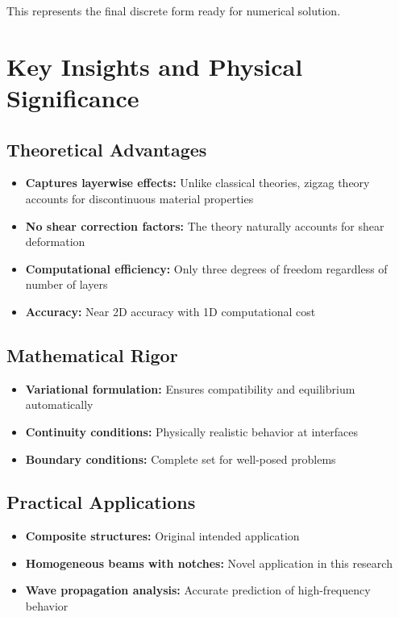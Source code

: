 \documentclass[12pt,a4paper]{article}
\begin{document}
This represents the final discrete form ready for numerical solution.

\section{Key Insights and Physical Significance}

\subsection{Theoretical Advantages}

\begin{itemize}
\item \textbf{Captures layerwise effects:} Unlike classical theories, zigzag theory accounts for discontinuous material properties
\item \textbf{No shear correction factors:} The theory naturally accounts for shear deformation
\item \textbf{Computational efficiency:} Only three degrees of freedom regardless of number of layers
\item \textbf{Accuracy:} Near 2D accuracy with 1D computational cost
\end{itemize}

\subsection{Mathematical Rigor}

\begin{itemize}
\item \textbf{Variational formulation:} Ensures compatibility and equilibrium automatically
\item \textbf{Continuity conditions:} Physically realistic behavior at interfaces
\item \textbf{Boundary conditions:} Complete set for well-posed problems
\end{itemize}

\subsection{Practical Applications}

\begin{itemize}
\item \textbf{Composite structures:} Original intended application
\item \textbf{Homogeneous beams with notches:} Novel application in this research
\item \textbf{Wave propagation analysis:} Accurate prediction of high-frequency behavior
\end{itemize}
\end{document}
